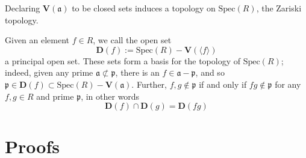 \begin{defn}
    Declaring \(\mathbf{V}(\mathfrak{a})\) to be closed sets induces a topology on \(\mathrm{Spec}(R)\), the Zariski topology.

    Given an element \(f \in R\), we call the open set
    \begin{equation}
        \mathbf{D}(f) := \mathrm{Spec}(R) - \mathbf{V}(\langle f \rangle)
    \end{equation}
    a principal open set. These sets form a basis for the topology of \(\mathrm{Spec}(R)\); indeed, given any prime \(\mathfrak{a} \not\subset \mathfrak{p}\), there is an \(f \in \mathfrak{a} - \mathfrak{p}\), and so \(\mathfrak{p} \in \mathbf{D}(f) \subset \mathrm{Spec}(R) - \mathbf{V}(\mathfrak{a})\). Further, \(f, g \not\in \mathfrak{p}\) if and only if \(fg \not\in \mathfrak{p}\) for any \(f, g \in R\) and prime \(\mathfrak{p}\), in other words
    \begin{equation}
        \mathbf{D}(f) \cap \mathbf{D}(g) = \mathbf{D}(fg)
    \end{equation}
\end{defn}

\section{Proofs}

